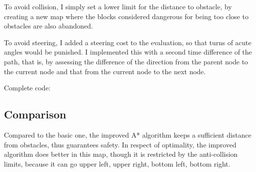 \documentclass[aps,letterpaper,10pt]{revtex4}
\begin{document}
\vspace{3mm} 
To avoid collision, I simply set a lower limit for the distance to obstacle, by creating a new map where the blocks considered dangerous for being too close to obstacles are also abandoned.

\vspace{5mm}
	
	\vspace{3mm}

\vspace{3mm} 
To avoid steering, I added a steering cost to the evaluation, so that turns of acute angles would be punished. I implemented this with a second time difference of the path, that is, by assessing the difference of the direction from the parent node to the current node and that from the current node to the next node. 

\vspace{5mm}
	
	\vspace{3mm}

Complete code:
\vspace{5mm}
	
	\vspace{3mm}
\newpage	
\subsection{Comparison}
\vspace{3mm} 
Compared to the basic one, the improved A* algorithm keeps a sufficient distance from obstacles, thus guarantees safety. In respect of optimality, the improved algorithm does better in this map, though it is restricted by the anti-collision limits, because it can go upper left, upper right, bottom left, bottom right. 
\newpage
\end{document}
